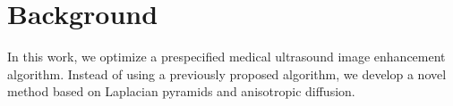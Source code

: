 
\section{Background}\label{section:background}
In this work, we optimize a prespecified medical ultrasound image enhancement algorithm.
Instead of using a previously proposed algorithm, we develop a novel method based on Laplacian pyramids and anisotropic diffusion.


